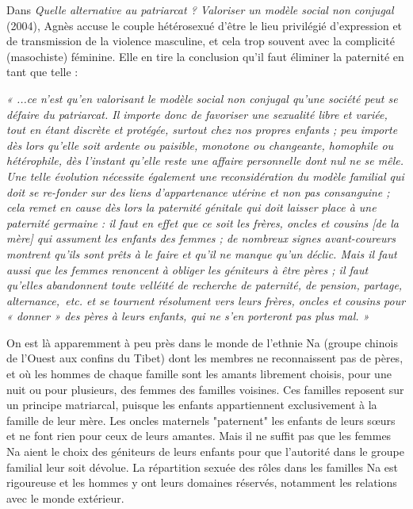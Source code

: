  
Dans \emph{Quelle alternative au patriarcat ? Valoriser un modèle social non conjugal} (2004), Agnès  accuse le couple hétérosexué d'être le lieu privilégié d'expression et de transmission de la violence masculine, et cela trop souvent avec la complicité (masochiste) féminine. Elle en tire la conclusion qu'il faut éliminer la paternité en tant que telle :
\begin{displayquote}
\emph{« ...ce n'est qu'en valorisant le modèle social non conjugal qu'une société peut se défaire du patriarcat. Il importe donc de favoriser une sexualité libre et variée, tout en étant discrète et protégée, surtout chez nos propres enfants ; peu importe dès lors qu'elle soit ardente ou paisible, monotone ou changeante, homophile ou hétérophile, dès l'instant qu'elle reste une affaire personnelle dont nul ne se mêle. Une telle évolution nécessite également une reconsidération du modèle familial qui doit se re-fonder sur des liens d'appartenance utérine et non pas consanguine ; cela remet en cause dès lors la paternité génitale qui doit laisser place à une paternité germaine : il faut en effet que ce soit les frères, oncles et cousins [de la mère] qui assument les enfants des femmes ; de nombreux signes avant-coureurs montrent qu'ils sont prêts à le faire et qu'il ne manque qu'un déclic. Mais il faut aussi que les femmes renoncent à obliger les géniteurs à être pères ; il faut qu'elles abandonnent toute velléité de recherche de paternité, de pension, partage, alternance,~etc. et se tournent résolument vers leurs frères, oncles et cousins pour « donner » des pères à leurs enfants, qui ne s'en porteront pas plus mal. »}
\end{displayquote}

On est là apparemment à peu près dans le monde de l'ethnie Na (groupe chinois de l’Ouest aux confins du Tibet) dont les membres ne reconnaissent pas de pères, et où les hommes de chaque famille sont les amants librement choisis, pour une nuit ou pour plusieurs, des femmes des familles voisines. Ces familles reposent sur un principe matriarcal, puisque les enfants appartiennent exclusivement à la famille de leur mère. Les oncles maternels "paternent" les enfants de leurs sœurs et ne font rien pour ceux de leurs amantes. Mais il ne suffit pas que les femmes Na aient le choix des géniteurs de leurs enfants pour que l'autorité dans le groupe familial leur soit dévolue. La répartition sexuée des rôles dans les familles Na est rigoureuse et les hommes y ont leurs domaines réservés, notamment les relations avec le monde extérieur.

